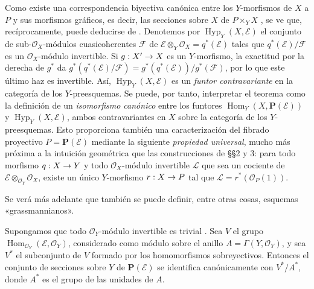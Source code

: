 \documentclass[oneside,10pt]{amsart}
\makeatletter
\newcommand{\ega@arrow}[2]{\mathchoice{#1}{#2}{#2}{#2}}
\renewcommand{\to}{\ega@arrow{\longrightarrow}{\rightarrow}}
\let\EGAOriginalLabel\label
\renewcommand{\label}[1]{\phantomsection\EGAOriginalLabel{#1}}
\makeatother
\begin{document}
\begin{remark}[4.2.5]
\label{II.4.2.5-fr}
Como existe una correspondencia biyectiva canónica entre los $Y$-morfismos de $X$ a $P$ y sus morfismos gráficos, es decir, las secciones sobre $X$ de $P\times_YX$ , se ve que, recíprocamente,  puede deducirse de .
Denotemos por $\operatorname{Hyp}_Y(X,\mathcal{E})$ el conjunto de sub-$\mathcal{O}_X$-módulos cuasicoherentes $\mathcal{F}$ de $\mathcal{E}\otimes_Y\mathcal{O}_X=q^*(\mathcal{E})$ tales que $q^*(\mathcal{E})/\mathcal{F}$ es un $\mathcal{O}_X$-módulo invertible.
Si $g:X'\to X$ es un $Y$-morfismo, la exactitud por la derecha de $g^*$ da
$g^*(q^*(\mathcal{E})/\mathcal{F})=g^*(q^*(\mathcal{E}))/g^*(\mathcal{F})$,
por lo que este último haz es invertible. Así, $\operatorname{Hyp}_Y(X,\mathcal{E})$ es un \emph{funtor contravariante} en la categoría de los $Y$-preesquemas.
Se puede, por tanto, interpretar el teorema  como la definición de un \emph{isomorfismo canónico} entre los funtores $\operatorname{Hom}_Y(X,\mathbf{P}(\mathcal{E}))$ y $\operatorname{Hyp}_Y(X,\mathcal{E})$, ambos contravariantes en $X$ sobre la categoría de los $Y$-preesquemas.
Esto proporciona también una caracterización del fibrado proyectivo $P=\mathbf{P}(\mathcal{E})$ mediante la siguiente \emph{propiedad universal}, mucho más próxima a la intuición geométrica que las construcciones de §§2 y 3:
para todo morfismo $q:X\to Y$ y todo $\mathcal{O}_X$-módulo invertible $\mathcal{L}$ que sea un cociente de $\mathcal{E}\otimes_{\mathcal{O}_Y}\mathcal{O}_X$, existe un único $Y$-morfismo $r:X\to P$ tal que $\mathcal{L}=r^*(\mathcal{O}_P(1))$.

Se verá más adelante que también se puede definir, entre otras cosas, esquemas «grassmannianos».
\end{remark}

\begin{corollary}[4.2.6]
\label{II.4.2.6-fr}
Supongamos que todo $\mathcal{O}_Y$-módulo invertible es trivial .
Sea $V$ el grupo $\operatorname{Hom}_{\mathcal{O}_Y}(\mathcal{E},\mathcal{O}_Y)$, considerado como módulo sobre el anillo $A=\Gamma(Y,\mathcal{O}_Y)$, y sea $V^*$ el subconjunto de $V$ formado por los homomorfismos sobreyectivos.
Entonces el conjunto de secciones sobre $Y$ de $\mathbf{P}(\mathcal{E})$ se identifica canónicamente con $V^*/A^*$, donde $A^*$ es el grupo de las unidades de $A$.
\end{corollary}
\end{document}
